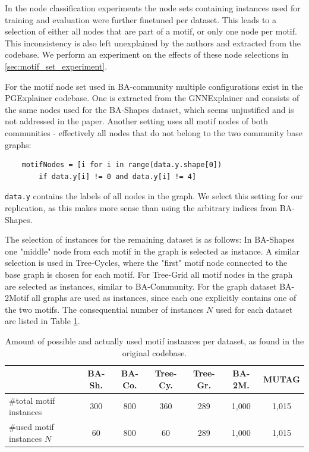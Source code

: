 In the node classification experiments the node sets containing instances used for training and evaluation were further finetuned per dataset. This leads to a selection of either all nodes that are part of a motif, or only one node per motif. This inconsistency is also left unexplained by the authors and extracted from the codebase. We perform an experiment on the effects of these node selections in \ref{sec:motif_set_experiment}.

For the motif node set used in BA-community multiple configurations exist in the PGExplainer codebase. One is extracted from the GNNExplainer \cite{ying2019gnnexplainer} and consists of the same nodes used for the BA-Shapes dataset, which seems unjustified and is not addressed in the paper. Another setting uses all motif nodes of both communities - effectively all nodes that do not belong to the two community base graphs:
\begin{verbatim}
    motifNodes = [i for i in range(data.y.shape[0]) 
        if data.y[i] != 0 and data.y[i] != 4]
\end{verbatim}
\verb|data.y| contains the labels of all nodes in the graph.
We select this setting for our replication, as this makes more sense than using the arbitrary indices from BA-Shapes. \bigskip

The selection of instances for the remaining dataset is as follows: In BA-Shapes one "middle" node from each motif in the graph is selected as instance. A similar selection is used in Tree-Cycles, where the "first" motif node connected to the base graph is chosen for each motif. For Tree-Grid all motif nodes in the graph are selected as instances, similar to BA-Community. For the graph dataset BA-2Motif all graphs are used as instances, since each one explicitly contains one of the two motifs. The consequential number of instances $N$ used for each dataset are listed in Table \ref{tab:motif-statistics}.

\begin{table}[h]
    \centering
    \scriptsize
    \begin{tabular}{l|cccc|cc}
    \hline
    \textbf{} & \textbf{BA-Sh.} & \textbf{BA-Co.} & \textbf{Tree-Cy.} & \textbf{Tree-Gr.} & \textbf{BA-2M.} & \textbf{MUTAG} \\
    \hline
    \#total motif instances & 300 & 800 & 360 & 289 & 1,000 & 1,015 \\
    \#used motif instances $N$ & 60 & 800 & 60 & 289 & 1,000 & 1,015 \\
    \hline
    \end{tabular}
    \caption[Statistics of motif instances per dataset]{Amount of possible and actually used motif instances per dataset, as found in the original codebase.}
    \label{tab:motif-statistics}
\end{table}



